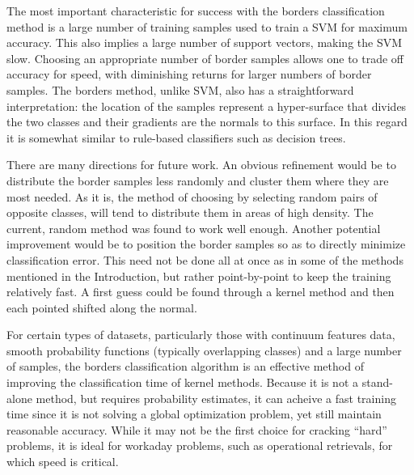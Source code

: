 The most important characteristic for success with the borders classification 
method is a large number of training samples
used to train a SVM for maximum accuracy.
This also implies a large number of support vectors, making the
SVM slow.
Choosing an appropriate number of border samples allows one to trade off
accuracy for speed, with diminishing returns for larger numbers of border samples.
The borders method, unlike SVM, also has a straightforward interpretation:
the location of the samples represent a hyper-surface that divides the two
classes and their gradients are the normals to this surface.
In this regard it is somewhat similar to rule-based classifiers such as
decision trees.

There are many directions for future work.
An obvious refinement would be to distribute the border samples less 
randomly and cluster them where they are most needed.
As it is, the method of choosing by selecting random pairs of opposite
classes, will tend to distribute them in areas of high density.
The current, random method was found to work well enough.
Another potential improvement would be to position the border samples
so as to directly minimize classification error.
This need not be done all at once as in some of the methods mentioned
in the Introduction, but rather point-by-point to keep the training
relatively fast.
A first guess could be found through a kernel method and then each
pointed shifted along the normal.

For certain types of datasets, particularly those with continuum features
data, smooth probability functions (typically overlapping classes) and a large number of samples, 
the borders classification algorithm is an 
effective method of improving the classification time of kernel methods.
Because it is not a stand-alone method, but requires probability estimates,
it can acheive a fast training time since it is not solving a global
optimization problem, yet still maintain reasonable accuracy.
While it may not be the first choice for cracking ``hard'' problems, it
is ideal for workaday problems, such as operational retrievals,
for which speed is critical.

